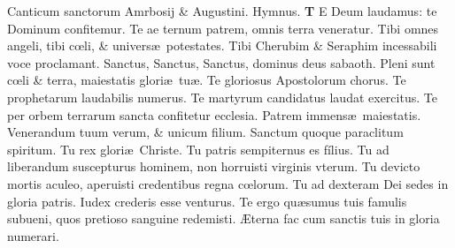 \documentclass[a5paper,10pt]{book}
\def\ae{æ}
\def\AE{Æ}
\def\oe{œ}
\begin{document}
\begin{multicols*}{2}
\newline {} \color{red} Canticum sanctorum Amrbosij \& Augustini. Hymnus. \color{black}
\vspace{-1em}
\lettrine[lines=2]{\bfseries \color{red} T}{}
E Deum laudamus: te Dominum confitemur.
\newline \color{red} T\color{black}e ae ternum patrem, omnis terra veneratur.
\newline \color{red} T\color{black}ibi omnes angeli,  tibi c\oe li, \& univers\ae\ potestates.
\newline \color{red} T\color{black}ibi Cherubim \& Seraphim incessabili voce proclamant.
\newline \color{red} S\color{black}anctus, Sanctus, Sanctus, dominus deus sabaoth.
\newline \color{red} P\color{black}leni sunt c\oe li \& terra, maiestatis glori\ae \ tu\ae .
\newline \color{red} T\color{black}e gloriosus Apostolorum chorus.
\newline \color{red} T\color{black}e prophetarum laudabilis numerus.
\newline \color{red} T\color{black}e martyrum candidatus laudat exercitus.
\newline \color{red} T\color{black}e per orbem terrarum sancta confitetur ecclesia.
\newline \color{red} P\color{black}atrem  immens\ae \ maiestatis.
\newline \color{red} V\color{black}enerandum tuum verum, \& unicum filium.
\newline \color{red} S\color{black}anctum quoque paraclitum spiritum.
\newline \color{red} T\color{black}u rex glori\ae \ Christe.
\newline \color{red} T\color{black}u patris sempiternus es fílius.
\newline \color{red} T\color{black}u ad liberandum suscepturus hominem, non horruisti virginis vterum.
\newline \color{red} T\color{black}u devicto mortis aculeo, aperuisti credentibus regna c\oe lorum.
\newline \color{red} T\color{black}u ad dexteram Dei sedes in gloria patris.
\newline \color{red} I\color{black}udex crederis esse venturus.
\newline \color{red} T\color{black}e ergo qu\ae sumus tuis famulis subueni, quos pretioso sanguine redemisti.
\newline \color{red} \AE \color{black}terna fac cum sanctis tuis in gloria numerari.

\end{multicols*}
\end{document}

